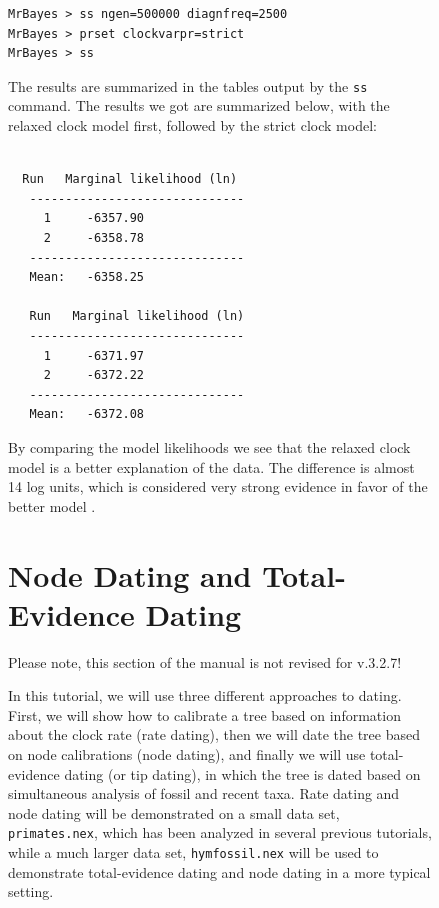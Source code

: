 \documentclass[12pt]{book}
\newcommand{\ttt}[1]{\texttt{#1}}
\begin{document}
\begin{figure}[h]
\small
\begin{singlespacing}
\begin{verbatim}
MrBayes > ss ngen=500000 diagnfreq=2500
MrBayes > prset clockvarpr=strict
MrBayes > ss
\end{verbatim}
\end{singlespacing}
\normalsize

The results are summarized in the tables output by the \ttt{ss} command. The results we got are
summarized below, with the relaxed clock model first, followed by the strict clock model:

\begin{singlespacing}
\footnotesize
\begin{verbatim}

  Run   Marginal likelihood (ln)
   ------------------------------
     1     -6357.90   
     2     -6358.78   
   ------------------------------
   Mean:   -6358.25

   Run   Marginal likelihood (ln)
   ------------------------------
     1     -6371.97   
     2     -6372.22   
   ------------------------------
   Mean:   -6372.08

\end{verbatim}
\end{singlespacing}
\normalsize

By comparing the model likelihoods we see that the relaxed clock model is a better explanation of
the data. The difference is almost 14 log units, which is considered very strong evidence in favor
of the better model \citep{kass95}.


\section{Node Dating and Total-Evidence Dating}

\vspace{10 pt}
{\large\color{red} Please note, this section of the manual is not revised for v.3.2.7!}

In this tutorial, we will use three different approaches to dating. First, we will show how to
calibrate a tree based on information about the clock rate (rate dating), then we will date the
tree based on node calibrations (node dating), and finally we will use total-evidence dating (or
tip dating), in which the tree is dated based on simultaneous analysis of fossil and recent taxa.
Rate dating and node dating will be demonstrated on a small data set, \ttt{primates.nex}, which has
been analyzed in several previous tutorials, while a much larger data set, \ttt{hymfossil.nex} will
be used to demonstrate total-evidence dating and node dating in a more typical setting.


\end{figure}
\end{document}
